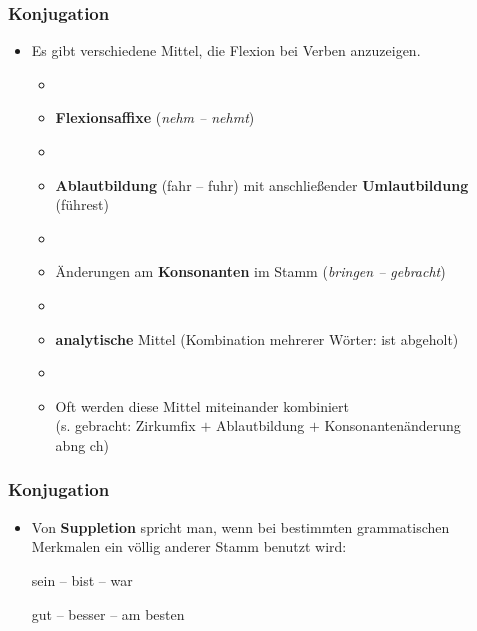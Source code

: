 
\begin{frame}
\frametitle{Konjugation}

\begin{itemize}
	\item Es gibt verschiedene Mittel, die Flexion bei Verben anzuzeigen. 
	
	\begin{itemize}
	\item[]
	\item \textbf{Flexionsaffixe} (\textit{nehm -- nehmt}) 
	\item[]
	\item \textbf{Ablautbildung} (fahr -- fuhr) mit anschließender \textbf{Umlautbildung} (führest) 
	\item[]
	\item Änderungen am \textbf{Konsonanten} im Stamm (\textit{bringen -- gebracht})
	\item[]
	\item \textbf{analytische} Mittel (Kombination mehrerer Wörter: ist abgeholt) 
	\item[]
	\item Oft werden diese Mittel miteinander kombiniert\\
	(s. gebracht: Zirkumfix  $+$ Ablautbildung  $+$ Konsonantenänderung \\ab{ng \ras ch})
	\end{itemize}

\end{itemize}


\end{frame}




\begin{frame}
\frametitle{Konjugation}

\begin{itemize}
	\item Von \textbf{Suppletion} spricht man, wenn bei bestimmten grammatischen Merkmalen ein völlig anderer Stamm benutzt wird:
	
\vspace{1em}
	
	\ea sein -- bist -- war
	\z
	
	\ea gut -- besser -- am besten
	\z
	
	
	
\end{itemize}


\end{frame}


